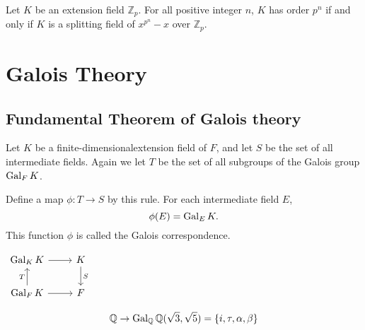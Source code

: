 \begin{theorem}
    Let $K$ be an extension field $\mathbb{Z}_p$. For all positive integer $n$, 
    $K$ has order $p^n$ if and only if $K$ is a splitting field of $x^{p^n} - x$ over $\mathbb{Z}_p$.
\end{theorem}

\section{Galois Theory}

\subsection{Fundamental Theorem of Galois theory}

\begin{definition}
    Let $K$ be a finite-dimensionalextension field of $F$, and let 
    $S$ be the set of all intermediate fields. Again we let 
    $T$ be the set of all subgroups of the Galois group $\operatorname{Gal}_F K$.

    Define a map $\phi : T \to S$ by this rule. For each intermediate field $E$,
    \begin{equation}
        \phi(E) = \operatorname{Gal}_E K.
    \end{equation} 
    This function $\phi$ is called the Galois correspondence.

    \begin{center}
        $\begin{tikzcd}
            \gal_K K \arrow[r] 
            & K \arrow[d, "S"] \\
            \gal_F K \arrow[u,"T"] \arrow[r]
            & F
            \end{tikzcd}
        $
    \end{center}
\end{definition}

\begin{example}
    \[
        \mathbb{Q} \rightarrow \operatorname{Gal}_\mathbb{Q} \mathbb{Q}(\sqrt{3}, \sqrt{5}) = \{i, \tau, \alpha, \beta \}
    \]
\end{example}

